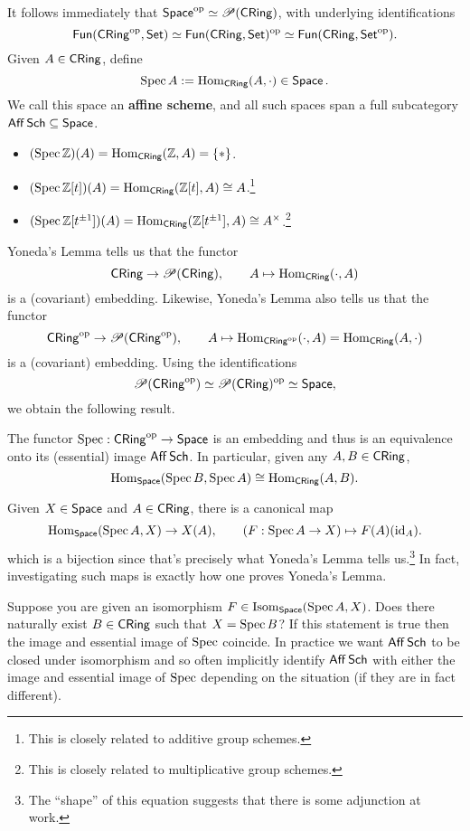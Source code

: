 \documentclass[11pt]{article}
\begin{document}
It follows immediately that $\Space^{\op}\simeq\Pre(\CRing)$, with underlying identifications
$$\Fun(\CRing^{\op},\Set)\simeq\Fun(\CRing,\Set)^{\op}\simeq\Fun(\CRing,\Set^{\op}).$$ 
Given $A\in\CRing$, define 
$$\Spec A:=\Hom_{\CRing}(A,\cdot)\in\Space.$$ 
We call this space an \textbf{affine scheme}, and all such spaces span a full subcategory $\Aff\Sch\subset\Space$.

\begin{example}
\hfill
\begin{itemize}
\item $(\Spec\Z)(A)=\Hom_{\CRing}(\Z,A)=\{*\}$.

\item $(\Spec\Z[t])(A)=\Hom_{\CRing}(\Z[t],A)\iso A$.\footnote{This is closely related to additive group schemes.}

\item $(\Spec\Z[t^{\pm1}])(A)=\Hom_{\CRing}(\Z[t^{\pm1}],A)\iso A^{\times}$.\footnote{This is closely related to multiplicative group schemes.}
\end{itemize}
\end{example}

Yoneda's Lemma tells us that the functor 
$$\CRing\to\Pre(\CRing),\qquad A\mapsto\Hom_{\CRing}(\cdot,A)$$
is a (covariant) embedding. Likewise, Yoneda's Lemma also tells us that the functor
$$\CRing^{\op}\to\Pre(\CRing^{\op}),\qquad A\mapsto\Hom_{\CRing^{\op}}(\cdot,A)=\Hom_{\CRing}(A,\cdot)$$
is a (covariant) embedding. Using the identifications
$$\Pre(\CRing^{\op})\simeq\Pre(\CRing)^{\op}\simeq\Space,$$
we obtain the following result.

\begin{theorem}
The functor $\Spec: \CRing^{\op}\to\Space$ is an embedding and thus is an equivalence onto its (essential) image $\Aff\Sch$. In particular, given any $A,B\in\CRing$,
$$\Hom_{\Space}(\Spec B,\Spec A)\iso\Hom_{\CRing}(A,B).$$
\end{theorem}

Given $X\in\Space$ and $A\in\CRing$, there is a canonical map 
$$\Hom_{\Space}(\Spec A,X)\to X(A),\qquad (F: \Spec A\to X)\mapsto F(A)(\id_A).$$
which is a bijection since that's precisely what Yoneda's Lemma tells us.\footnote{The ``shape'' of this equation suggests that there is some adjunction at work.} In fact, investigating such maps is exactly how one proves Yoneda's Lemma.

\begin{exercise}
Suppose you are given an isomorphism $F\in\Isom_{\Space}(\Spec A,X)$. Does there naturally exist $B\in\CRing$ such that $X=\Spec B$? If this statement is true then the image and essential image of $\Spec$ coincide. In practice we want $\Aff\Sch$ to be closed under isomorphism and so often implicitly identify $\Aff\Sch$ with either the image and essential image of $\Spec$ depending on the situation (if they are in fact different).
\end{exercise}
\end{document}
